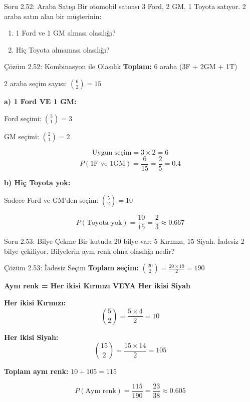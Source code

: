 \documentclass[light]{lutbeamer}
\begin{document}
\begin{frame}{Soru 2.52: Araba Satışı}
    Bir otomobil satıcısı 3 Ford, 2 GM, 1 Toyota satıyor. 2 araba satın alan bir müşterinin:
    \begin{enumerate}
        \item 1 Ford ve 1 GM alması olasılığı?
        \item Hiç Toyota almaması olasılığı?
    \end{enumerate}
\end{frame}

\begin{frame}{Çözüm 2.52: Kombinasyon ile Olasılık}
    \color{blue}
    \textbf{Toplam:} 6 araba (3F + 2GM + 1T)
    
    2 araba seçim sayısı: $\binom{6}{2} = 15$
    
    \vspace{0.3cm}
    \textbf{a) 1 Ford VE 1 GM:}
    
    Ford seçimi: $\binom{3}{1} = 3$
    
    GM seçimi: $\binom{2}{1} = 2$
    
    \[ \text{Uygun seçim} = 3 \times 2 = 6 \]
    \[ P(\text{1F ve 1GM}) = \frac{6}{15} = \frac{2}{5} = 0.4 \]
    
    \vspace{0.3cm}
    \textbf{b) Hiç Toyota yok:}
    
    Sadece Ford ve GM'den seçim: $\binom{5}{2} = 10$
    
    \[ P(\text{Toyota yok}) = \frac{10}{15} = \frac{2}{3} \approx 0.667 \]
\end{frame}

\begin{frame}{Soru 2.53: Bilye Çekme}
    Bir kutuda 20 bilye var: 5 Kırmızı, 15 Siyah. İadesiz 2 bilye çekiliyor. Bilyelerin aynı renk olma olasılığı nedir?
\end{frame}

\begin{frame}{Çözüm 2.53: İadesiz Seçim}
    \color{blue}
    \textbf{Toplam seçim:} $\binom{20}{2} = \frac{20 \times 19}{2} = 190$
    
    \vspace{0.3cm}
    \textbf{Aynı renk = Her ikisi Kırmızı VEYA Her ikisi Siyah}
    
    \vspace{0.3cm}
    \textbf{Her ikisi Kırmızı:}
    \[ \binom{5}{2} = \frac{5 \times 4}{2} = 10 \]
    
    \textbf{Her ikisi Siyah:}
    \[ \binom{15}{2} = \frac{15 \times 14}{2} = 105 \]
    
    \vspace{0.3cm}
    \textbf{Toplam aynı renk:} $10 + 105 = 115$
    
    \[ P(\text{Aynı renk}) = \frac{115}{190} = \frac{23}{38} \approx 0.605 \]
    
    \begin{center}
    \end{center}
\end{frame}
\end{document}
